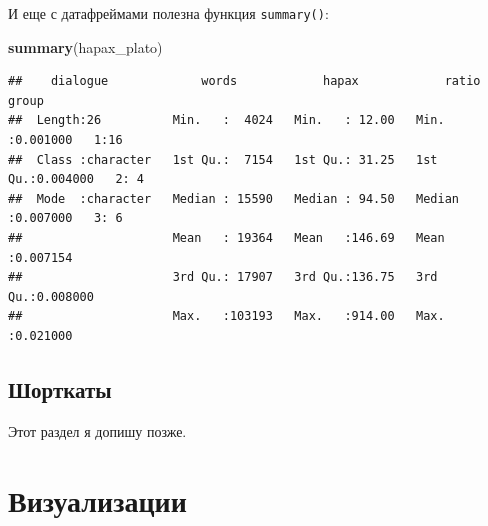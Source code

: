 \documentclass[
]{book}
\newenvironment{Shaded}{\begin{snugshade}}{\end{snugshade}}
\newcommand{\CommentTok}[1]{\textcolor[rgb]{0.56,0.35,0.01}{\textit{#1}}}
\newcommand{\DecValTok}[1]{\textcolor[rgb]{0.00,0.00,0.81}{#1}}
\newcommand{\FunctionTok}[1]{\textcolor[rgb]{0.13,0.29,0.53}{\textbf{#1}}}
\newcommand{\NormalTok}[1]{#1}
\newcommand{\OtherTok}[1]{\textcolor[rgb]{0.56,0.35,0.01}{#1}}
\newcommand{\SpecialCharTok}[1]{\textcolor[rgb]{0.81,0.36,0.00}{\textbf{#1}}}
\theoremstyle{definition}
\theoremstyle{definition}
\theoremstyle{definition}
\theoremstyle{definition}
\theoremstyle{remark}
\begin{document}
\begin{Shaded}
\end{Shaded}

И еще с датафреймами полезна функция \texttt{summary()}:

\begin{Shaded}
\begin{Highlighting}[]
\FunctionTok{summary}\NormalTok{(hapax\_plato)}
\end{Highlighting}
\end{Shaded}

\begin{verbatim}
##    dialogue             words            hapax            ratio          group 
##  Length:26          Min.   :  4024   Min.   : 12.00   Min.   :0.001000   1:16  
##  Class :character   1st Qu.:  7154   1st Qu.: 31.25   1st Qu.:0.004000   2: 4  
##  Mode  :character   Median : 15590   Median : 94.50   Median :0.007000   3: 6  
##                     Mean   : 19364   Mean   :146.69   Mean   :0.007154         
##                     3rd Qu.: 17907   3rd Qu.:136.75   3rd Qu.:0.008000         
##                     Max.   :103193   Max.   :914.00   Max.   :0.021000
\end{verbatim}

\hypertarget{ux448ux43eux440ux442ux43aux430ux442ux44b}{%
\section{Шорткаты}\label{ux448ux43eux440ux442ux43aux430ux442ux44b}}

Этот раздел я допишу позже.

\hypertarget{ux432ux438ux437ux443ux430ux43bux438ux437ux430ux446ux438ux438}{%
\chapter{Визуализации}\label{ux432ux438ux437ux443ux430ux43bux438ux437ux430ux446ux438ux438}}
\end{document}
